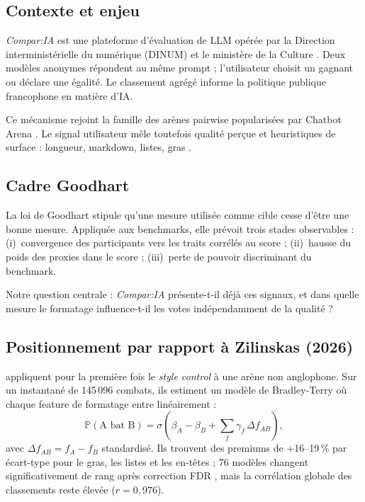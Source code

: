 \documentclass[11pt,a4paper]{article}
\begin{document}
\subsection{Contexte et enjeu}

\emph{Compar:IA} est une plateforme d'évaluation de LLM opérée par la Direction
interministérielle du numérique (DINUM) et le ministère de la Culture
\citep{termignon2026comparia}. Deux modèles anonymes répondent au même prompt ;
l'utilisateur choisit un gagnant ou déclare une égalité. Le classement agrégé
informe la politique publique francophone en matière d'IA.

Ce mécanisme rejoint la famille des arènes pairwise popularisées par Chatbot Arena
\citep{chiang2024chatbot,zheng2023judging}. Le signal utilisateur mêle toutefois
qualité perçue et heuristiques de surface : longueur, markdown, listes, gras
\citep{zheng2023judging,li2024crowdsourced}.

\subsection{Cadre Goodhart}

La loi de Goodhart \citep{goodhart1975problems,manheim2018categorizing} stipule
qu'une mesure utilisée comme cible cesse d'être une bonne mesure. Appliquée aux
benchmarks, elle prévoit trois stades observables \citep{espeland2016engines} :
(i)~convergence des participants vers les traits corrélés au score ;
(ii)~hausse du poids des proxies dans le score ;
(iii)~perte de pouvoir discriminant du benchmark.

Notre question centrale : \emph{Compar:IA} présente-t-il déjà ces signaux, et dans
quelle mesure le formatage influence-t-il les votes indépendamment de la qualité ?

\subsection{Positionnement par rapport à Zilinskas (2026)}

\citet{zilinskas2026formatting} appliquent pour la première fois le \emph{style
control} à une arène non anglophone. Sur un instantané de 145\,096 combats, ils
estiment un modèle de Bradley-Terry \citep{bradley1952rank} où chaque feature de
formatage entre linéairement :
\begin{equation}
  \mathbb{P}(\text{A bat B}) = \sigma\!\left(\beta_A - \beta_B + \sum_f \gamma_f \,\Delta f_{AB}\right),
  \label{eq:bt}
\end{equation}
avec $\Delta f_{AB} = f_A - f_B$ standardisé. Ils trouvent des premiums de
+16--19\,\% par écart-type pour le gras, les listes et les en-têtes ; 76 modèles
changent significativement de rang après correction FDR \citep{benjamini1995controlling},
mais la corrélation globale des classements reste élevée ($r = 0{,}976$).
\end{document}
